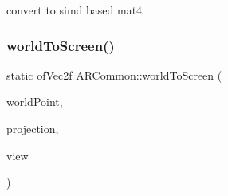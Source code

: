 convert to simd based mat4 

\mbox{\label{namespace_a_r_common_a9cd9f43005e2612ab5054dc3aec90fcf}} 
\subsubsection{\texorpdfstring{world\+To\+Screen()}{worldToScreen()}}
{\footnotesize\ttfamily static of\+Vec2f A\+R\+Common\+::world\+To\+Screen (\begin{DoxyParamCaption}\item[{of\+Point}]{world\+Point,  }\item[{of\+Matrix4x4}]{projection,  }\item[{of\+Matrix4x4}]{view }\end{DoxyParamCaption})\hspace{0.3cm}{\ttfamily [static]}}

